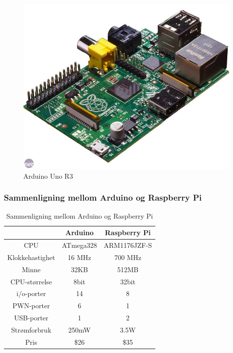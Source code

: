 \begin{figure}[h!]
\centering
\includegraphics[scale = 0.25]{img/pi.jpg}
\caption{Arduino Uno R3}
\end{figure}  

\subsubsection{Sammenligning mellom Arduino og Raspberry Pi}
\begin{table}[h!]
\caption{Sammenligning mellom Arduino og Raspberry Pi}
\centering
\begin{tabular}{ |c |c |c| }
	\hline
   & Arduino & Raspberry Pi \\
	\hline
  CPU & 	ATmega328 & ARM1176JZF-S \\
  Klokkehastighet & 16 MHz & 700 MHz \\
	Minne & 32KB & 512MB\\ 
	CPU-størrelse & 8bit & 32bit\\
	i/o-porter & 14 & 8 \\
	PWN-porter & 6 & 1 \\
	USB-porter & 1 & 2 \\
	Strømforbruk & 250mW & 3.5W\\
	Pris & \$26 & \$35 \\
	\hline  
\end{tabular}
\end{table}


